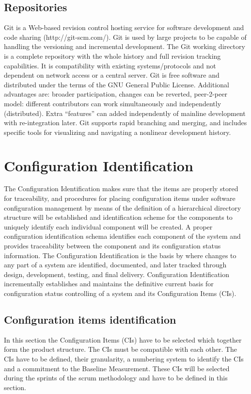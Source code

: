 \documentclass{template/openetcs_article}
\begin{document}
\subsection{Repositories}
Git is a Web-based revision control hosting service for software development and code sharing (http://git-scm.com/). Git is  used by large projects to be capable of handling the versioning and incremental development. The Git working directory is a  complete repository with the whole history and full revision tracking capabilities. It is compatibility with existing  systems/protocols and not dependent on network access or a central server. Git is free software and distributed under the  terms of the GNU General Public License.
Additional advantages are: broader participation, changes can be reverted, peer-2-peer model: different contributors can  work simultaneously and independently (distributed). Extra “features” can added independently of mainline development with  re-integration later. Git supports rapid branching and merging, and includes specific tools for visualizing and navigating a  nonlinear development history.

\section{Configuration Identification}
The Configuration Identification makes sure that the items are properly stored for traceability, and procedures for placing  configuration items under software configuration management by means of the definition of a hierarchical directory structure  will be established and identification scheme for the components to uniquely identify each individual component will be created.  A proper configuration identification schema identifies each component of the system and provides traceability between the  component and its configuration status information. 
The Configuration Identification is the basis by where changes to any part of a system are identified, documented, and later  tracked through design, development, testing, and final delivery. Configuration Identification incrementally establishes and  maintains the definitive current basis for configuration status controlling of a system and its Configuration Items (CIs).

\subsection{Configuration items identification }
In this section the Configuration Items (CIs) have to be selected which together form the product structure. The CIs must be  compatible with each other. The CIs have to be defined, their granularity, a numbering system to identify the CIs and a  commitment to the Baseline Measurement. These CIs will be selected during the sprints of the scrum methodology and have to  be defined in this section.
\end{document}
